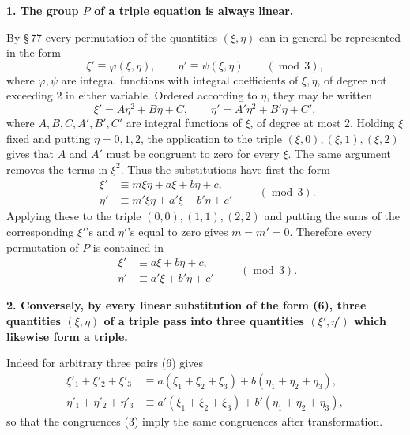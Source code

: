 \documentclass[11pt]{article}
\begin{document}
\textbf{1. The group \(P\) of a triple equation is always linear.}

By \S\,77 every permutation of the quantities \((\xi,\eta)\) can in general be represented in the form
\begin{equation}
 \xi'\equiv \varphi(\xi,\eta),\qquad \eta'\equiv \psi(\xi,\eta)
 \qquad(\operatorname{mod}\,3),
 \tag{4}
\end{equation}
where \(\varphi,\psi\) are integral functions with integral coefficients of \(\xi,\eta\), of degree not exceeding 2 in either variable. Ordered according to \(\eta\), they may be written
\begin{equation}
 \xi'=A\eta^2+B\eta+C,
 \qquad
 \eta'=A'\eta^2+B'\eta+C',
 \tag{5}
\end{equation}
where \(A,B,C,A',B',C'\) are integral functions of \(\xi\), of degree at most 2. Holding \(\xi\) fixed and putting \(\eta=0,1,2\), the application to the triple \((\xi,0),(\xi,1),(\xi,2)\) gives that \(A\) and \(A'\) must be congruent to zero for every \(\xi\). The same argument removes the terms in \(\xi^2\). Thus the substitutions have first the form
\[
\begin{aligned}
 \xi'&\equiv m\xi\eta+a\xi+b\eta+c,\\
 \eta'&\equiv m'\xi\eta+a'\xi+b'\eta+c'
\end{aligned}
\qquad(\operatorname{mod}\,3).
\]
Applying these to the triple \((0,0),(1,1),(2,2)\) and putting the sums of the corresponding \(\xi'\)'s and \(\eta'\)'s equal to zero gives \(m=m'=0\). Therefore every permutation of \(P\) is contained in
\begin{equation}
\begin{aligned}
 \xi'&\equiv a\xi+b\eta+c,\\
 \eta'&\equiv a'\xi+b'\eta+c'
\end{aligned}
\qquad(\operatorname{mod}\,3).
\tag{6}
\end{equation}

\textbf{2. Conversely, by every linear substitution of the form (6), three quantities \((\xi,\eta)\) of a triple pass into three quantities \((\xi',\eta')\) which likewise form a triple.}

Indeed for arbitrary three pairs (6) gives
\begin{equation}
\begin{aligned}
 \xi'_1+\xi'_2+\xi'_3&\equiv a(\xi_1+\xi_2+\xi_3)+b(\eta_1+\eta_2+\eta_3),\\
 \eta'_1+\eta'_2+\eta'_3&\equiv a'(\xi_1+\xi_2+\xi_3)+b'(\eta_1+\eta_2+\eta_3),
\end{aligned}
\tag{7}
\end{equation}
so that the congruences (3) imply the same congruences after transformation.
\end{document}
